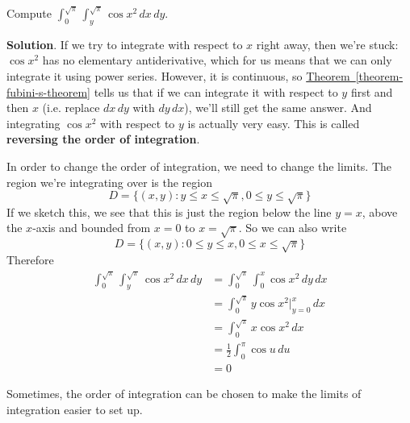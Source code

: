 \documentclass[10pt,]{book}
\newcommand{\terminology}[1]{\textbf{#1}}
\theoremstyle{ptxplainnotitle}
\theoremstyle{ptxplaintitle}
\theoremstyle{ptxplainnotitle}
\theoremstyle{ptxplaintitle}
\theoremstyle{ptxplainnotitle}
\theoremstyle{ptxplaintitle}
\theoremstyle{ptxdefinitionnotitle}
\theoremstyle{ptxdefinitiontitle}
\theoremstyle{ptxdefinitionnotitle}
\theoremstyle{ptxdefinitiontitle}
\theoremstyle{ptxdefinitionnotitle}
\theoremstyle{ptxdefinitiontitle}
\theoremstyle{ptxdefinitionnotitle}
\theoremstyle{ptxdefinitiontitle}
\theoremstyle{ptxdefinitionnotitle}
\theoremstyle{ptxdefinitiontitle}
\numberwithin{equation}{section}
\begin{document}
\begin{example}\label{example-reversing-the-order-of-integration}
\hypertarget{p-1133}{}%
Compute \(\int_{0}^{\sqrt{\pi}}\int_{y}^{\sqrt{\pi}}\cos x^{2}\,dx\,dy\).%
\par\smallskip%
\noindent\textbf{Solution}.\hypertarget{solution-180}{}\quad%
\hypertarget{p-1134}{}%
If we try to integrate with respect to \(x\) right away, then we're stuck: \(\cos x^{2}\) has no elementary antiderivative, which for us means that we can only integrate it using power series. However, it is continuous, so \hyperref[theorem-fubini-s-theorem]{Theorem~\ref{theorem-fubini-s-theorem}} tells us that if we can integrate it with respect to \(y\) first and then \(x\) (i.e. replace \(dx\,dy\) with \(dy\,dx\)), we'll still get the same answer. And integrating \(\cos x^{2}\) with respect to \(y\) is actually very easy. This is called \terminology{reversing the order of integration}.%
\par
\hypertarget{p-1135}{}%
In order to change the order of integration, we need to change the limits. The region we're integrating over is the region%
\begin{equation*}
D = \{(x,y) : y\leq x\leq \sqrt{\pi}, 0\leq y\leq\sqrt{\pi}\}
\end{equation*}
If we sketch this, we see that this is just the region below the line \(y = x\), above the \(x\)-axis and bounded from \(x=0\) to \(x=\sqrt{\pi}\). So we can also write%
\begin{equation*}
D = \{(x,y) : 0\leq y\leq x, 0\leq x\leq\sqrt{\pi}\}
\end{equation*}
Therefore%
\begin{align*}
\int_{0}^{\sqrt{\pi}}\int_{y}^{\sqrt{\pi}}\cos x^{2}\,dx\,dy & = \int_{0}^{\sqrt{\pi}}\int_{0}^{x}\cos x^{2}\,dy\,dx \\
& = \int_{0}^{\sqrt{\pi}}y\cos x^{2}\bigg|_{y=0}^{x}\,dx \\
& = \int_{0}^{\sqrt{\pi}}x\cos x^{2}\,dx \\
& = \frac{1}{2}\int_{0}^{\pi}\cos u\,du \\
& = 0 
\end{align*}
%
\end{example}
\hypertarget{p-1136}{}%
Sometimes, the order of integration can be chosen to make the limits of integration easier to set up.%
\end{document}
